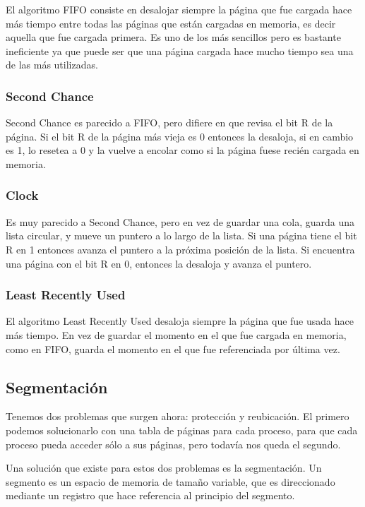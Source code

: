 \documentclass{article}
\begin{document}
El algoritmo FIFO consiste en desalojar siempre la p\'agina que fue cargada hace m\'as tiempo entre todas las p\'aginas que est\'an cargadas en memoria, es decir aquella que fue cargada primera. Es uno de los m\'as sencillos pero es bastante ineficiente ya que puede ser que una p\'agina cargada hace mucho tiempo sea una de las m\'as utilizadas.

\subsubsection{Second Chance}

Second Chance es parecido a FIFO, pero difiere en que revisa el bit R de la p\'agina. Si el bit R de la p\'agina m\'as vieja es 0 entonces la desaloja, si en cambio es 1, lo resetea a 0 y la vuelve a encolar como si la p\'agina fuese reci\'en cargada en memoria.

\subsubsection{Clock}

Es muy parecido a Second Chance, pero en vez de guardar una cola, guarda una lista circular, y mueve un puntero a lo largo de la lista. Si una p\'agina tiene el bit R en 1 entonces avanza el puntero a la pr\'oxima posici\'on de la lista. Si encuentra una p\'agina con el bit R en 0, entonces la desaloja y avanza el puntero.

\subsubsection{Least Recently Used}

El algoritmo Least Recently Used desaloja siempre la p\'agina que fue usada hace m\'as tiempo. En vez de guardar el momento en el que fue cargada en memoria, como en FIFO, guarda el momento en el que fue referenciada por \'ultima vez.

\subsection{Segmentaci\'on}

Tenemos dos problemas que surgen ahora: protecci\'on y reubicaci\'on. El primero podemos solucionarlo con una tabla de p\'aginas para cada proceso, para que cada proceso pueda acceder s\'olo a sus p\'aginas, pero todav\'ia nos queda el segundo.

Una soluci\'on que existe para estos dos problemas es la segmentaci\'on. Un segmento es un espacio de memoria de tama\~no variable, que es direccionado mediante un registro que hace referencia al principio del segmento.
\end{document}
